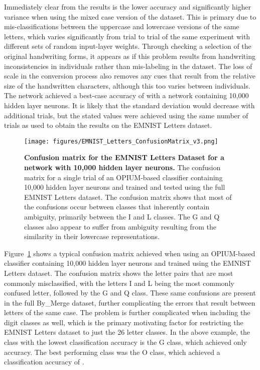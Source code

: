 \documentclass[conference]{IEEEtran}
\begin{document}
Immediately clear from the results is the lower accuracy and significantly higher variance when using the mixed case version of the dataset. This is primary due to mis-classifications between the uppercase and lowercase versions of the same letters, which varies significantly from trial to trial of the same experiment with different sets of random input-layer weights. Through checking a selection of the original handwriting forms, it appears as if this problem results from handwriting inconsistencies in individuals rather than mis-labeling in the dataset. The loss of scale in the conversion process also removes any cues that result from the relative size of the handwritten characters, although this too varies between individuals. The network achieved a best-case accuracy of  with a network containing 10,000 hidden layer neurons. It is likely that the standard deviation would decrease with additional trials, but the stated values were achieved using the same number of trials as used to obtain the results on the EMNIST Letters dataset.

\begin{figure}
  \centering
  \texttt{[image: figures/EMNIST\_Letters\_ConfusionMatrix\_v3.png]}
  \caption{\textbf{Confusion matrix for the EMNIST Letters Dataset for a network with 10,000 hidden layer neurons.} The confusion matrix for a single trial of an OPIUM-based classifier containing 10,000 hidden layer neurons and trained and tested using the full EMNIST Letters dataset. The confusion matrix shows that most of the confusions occur between classes that inherently contain ambiguity, primarily between the I and L classes. The G and Q classes also appear to suffer from ambiguity resulting from the similarity in their lowercase representations. }
  \label{fig:results-emnist-letters-confusions}
\end{figure}

Figure~\ref{fig:results-emnist-letters-confusions} shows a typical confusion matrix achieved when using an OPIUM-based classifier containing 10,000 hidden layer neurons and trained using the EMNIST Letters dataset. The confusion matrix shows the letter pairs that are most commonly misclassified, with the letters I and L being the most commonly confused letter, followed by the G and Q class. These same confusions are present in the full By\_Merge dataset, further complicating the errors that result between letters of the same case. The problem is further complicated when including the digit classes as well, which is the primary motivating factor for restricting the EMNIST Letters dataset to just the 26 letter classes. In the above example, the class with the lowest classification accuracy is the G class, which achieved only  accuracy. The best performing class was the O class, which achieved a classification accuracy of . 
\end{document}
